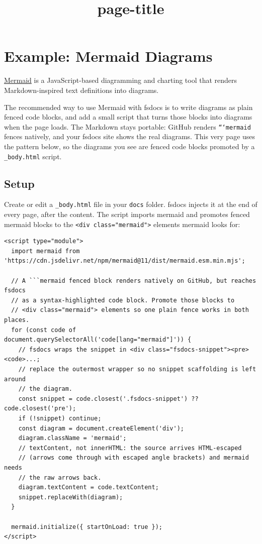 \documentclass{article}
\title{{page-title}}
\date{}
\begin{document}
\maketitle


\section*{Example: Mermaid Diagrams}



\href{https://mermaid.js.org/}{Mermaid} is a JavaScript-based diagramming and charting tool that renders Markdown-inspired text definitions into diagrams.


The recommended way to use Mermaid with fsdocs is to write diagrams as plain fenced code blocks, and add a small script that turns those blocks into diagrams when the page loads. The Markdown stays portable: GitHub renders \texttt{```mermaid} fences natively, and your fsdocs site shows the real diagrams. This very page uses the pattern below, so the diagrams you see are fenced code blocks promoted by a \texttt{\_body.html} script.
\subsection*{Setup}



Create or edit a \texttt{\_body.html} file in your \texttt{docs} folder. fsdocs injects it at the end of every page, after the content. The script imports mermaid and promotes fenced mermaid blocks to the \texttt{<div class="mermaid">} elements mermaid looks for:
\begin{lstlisting}
<script type="module">
  import mermaid from 'https://cdn.jsdelivr.net/npm/mermaid@11/dist/mermaid.esm.min.mjs';

  // A ```mermaid fenced block renders natively on GitHub, but reaches fsdocs
  // as a syntax-highlighted code block. Promote those blocks to
  // <div class="mermaid"> elements so one plain fence works in both places.
  for (const code of document.querySelectorAll('code[lang="mermaid"]')) {
    // fsdocs wraps the snippet in <div class="fsdocs-snippet"><pre><code>...;
    // replace the outermost wrapper so no snippet scaffolding is left around
    // the diagram.
    const snippet = code.closest('.fsdocs-snippet') ?? code.closest('pre');
    if (!snippet) continue;
    const diagram = document.createElement('div');
    diagram.className = 'mermaid';
    // textContent, not innerHTML: the source arrives HTML-escaped
    // (arrows come through with escaped angle brackets) and mermaid needs
    // the raw arrows back.
    diagram.textContent = code.textContent;
    snippet.replaceWith(diagram);
  }

  mermaid.initialize({ startOnLoad: true });
</script>

\end{lstlisting}
\end{document}
